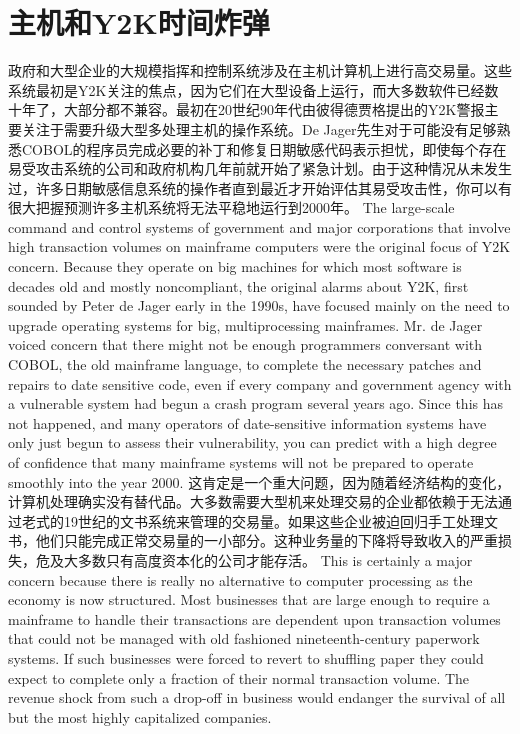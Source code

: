 \section{主机和Y2K时间炸弹}
\begin{paracol}{2}
政府和大型企业的大规模指挥和控制系统涉及在主机计算机上进行高交易量。这些系统最初是Y2K关注的焦点，因为它们在大型设备上运行，而大多数软件已经数十年了，大部分都不兼容。最初在20世纪90年代由彼得德贾格提出的Y2K警报主要关注于需要升级大型多处理主机的操作系统。De Jager先生对于可能没有足够熟悉COBOL的程序员完成必要的补丁和修复日期敏感代码表示担忧，即使每个存在易受攻击系统的公司和政府机构几年前就开始了紧急计划。由于这种情况从未发生过，许多日期敏感信息系统的操作者直到最近才开始评估其易受攻击性，你可以有很大把握预测许多主机系统将无法平稳地运行到2000年。
\switchcolumn
The large-scale command and control systems of government and major corporations that involve high transaction volumes on mainframe computers were the original focus of Y2K concern. Because they operate on big machines for which most software is decades old and mostly noncompliant, the original alarms about Y2K, first sounded by Peter de Jager early in the 1990s, have focused mainly on the need to upgrade operating systems for big, multiprocessing mainframes. Mr. de Jager voiced concern that there might not be enough programmers conversant with COBOL, the old mainframe language, to complete the necessary patches and repairs to date sensitive code, even if every company and government agency with a vulnerable system had begun a crash program several years ago. Since this has not happened, and many operators of date-sensitive information systems have only just begun to assess their vulnerability, you can predict with a high degree of confidence that many mainframe systems will not be prepared to operate smoothly into the year 2000.
\switchcolumn*
这肯定是一个重大问题，因为随着经济结构的变化，计算机处理确实没有替代品。大多数需要大型机来处理交易的企业都依赖于无法通过老式的19世纪的文书系统来管理的交易量。如果这些企业被迫回归手工处理文书，他们只能完成正常交易量的一小部分。这种业务量的下降将导致收入的严重损失，危及大多数只有高度资本化的公司才能存活。
\switchcolumn
This is certainly a major concern because there is really no alternative to computer processing as the economy is now structured. Most businesses that are large enough to require a mainframe to handle their transactions are dependent upon transaction volumes that could not be managed with old fashioned nineteenth-century paperwork systems. If such businesses were forced to revert to shuffling paper they could expect to complete only a fraction of their normal transaction volume. The revenue shock from such a drop-off in business would endanger the survival of all but the most highly capitalized companies.

\end{paracol}
